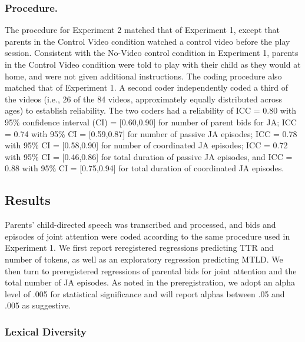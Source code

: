 \documentclass[man,floatsintext]{apa6}
\begin{document}
\hypertarget{procedure.-1}{%
\subsubsection{Procedure.}\label{procedure.-1}}

The procedure for Experiment 2 matched that of Experiment 1, except that parents in the Control Video condition watched a control video before the play session.
Consistent with the No-Video control condition in Experiment 1, parents in the Control Video condition were told to play with their child as they would at home, and were not given additional instructions.
The coding procedure also matched that of Experiment 1.
A second coder independently coded a third of the videos (i.e., 26 of the 84 videos, approximately equally distributed across ages) to establish reliability.
The two coders had a reliability of ICC = 0.80 with 95\% confidence interval (CI) = {[}0.60,0.90{]} for number of parent bids for JA; ICC = 0.74 with 95\% CI = {[}0.59,0.87{]} for number of passive JA episodes; ICC = 0.78 with 95\% CI = {[}0.58,0.90{]} for number of coordinated JA episodes; ICC = 0.72 with 95\% CI = {[}0.46,0.86{]} for total duration of passive JA episodes, and ICC = 0.88 with 95\% CI = {[}0.75,0.94{]} for total duration of coordinated JA episodes.

\hypertarget{results-1}{%
\subsection{Results}\label{results-1}}

Parents' child-directed speech was transcribed and processed, and bids and episodes of joint attention were coded according to the same procedure used in Experiment 1.
We first report reregistered regressions predicting TTR and number of tokens, as well as an exploratory regression predicting MTLD.
We then turn to preregistered regressions of parental bids for joint attention and the total number of JA episodes.
As noted in the preregistration, we adopt an alpha level of .005 for statistical significance and will report alphas between .05 and .005 as suggestive.

\hypertarget{lexical-diversity-1}{%
\subsubsection{Lexical Diversity}\label{lexical-diversity-1}}
\end{document}
